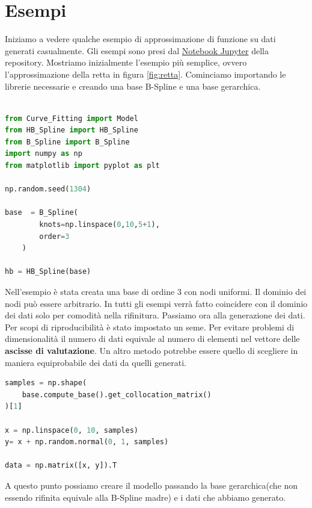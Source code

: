 \documentclass[../main.tex]{subfiles}
\begin{document}
\section{Esempi}
Iniziamo a vedere qualche esempio di approssimazione di funzione su dati generati casualmente.
Gli esempi sono presi dal \href{https://github.com/cMancio00/B-Spline/blob/main/esempi.ipynb}{Notebook Jupyter} della repository.
Mostriamo inizialmente l'esempio più semplice, ovvero l'approssimazione della retta in figura \ref*{fig:retta}. Cominciamo importando 
le librerie necessarie e creando una base B-Spline e una base gerarchica.

\begin{lstlisting}[language=Python, caption={Dichiarazione della base}]

from Curve_Fitting import Model
from HB_Spline import HB_Spline
from B_Spline import B_Spline
import numpy as np
from matplotlib import pyplot as plt

np.random.seed(1304)

base  = B_Spline(
        knots=np.linspace(0,10,5+1),
        order=3
    )

hb = HB_Spline(base)

\end{lstlisting}

Nell'esempio è stata creata una base di ordine 3 con nodi uniformi. Il dominio dei nodi può essere arbitrario. In tutti gli esempi verrà 
fatto coincidere con il dominio dei dati solo per comodità nella rifinitura.
Passiamo ora alla generazione dei dati. Per scopi di riproducibilità è stato impostato un seme. Per evitare problemi di dimensionalità 
il numero di dati equivale al numero di elementi nel vettore delle \textbf{ascisse di valutazione}. Un altro metodo potrebbe essere 
quello di scegliere in maniera equiprobabile dei dati da quelli generati. 

\begin{lstlisting}[language=Python, caption={Creazione e fit del modello}]
samples = np.shape(
    base.compute_base().get_collocation_matrix()
)[1]

x = np.linspace(0, 10, samples)
y= x + np.random.normal(0, 1, samples)

data = np.matrix([x, y]).T
\end{lstlisting} 

A questo punto possiamo creare il modello passando la base gerarchica(che non essendo rifinita equivale alla B-Spline madre) e i dati
che abbiamo generato.
\end{document}
